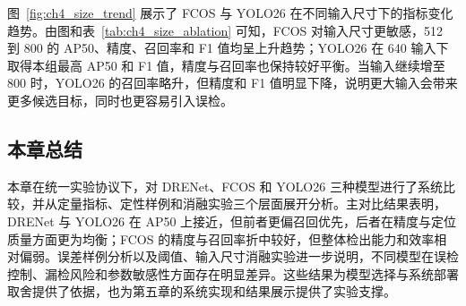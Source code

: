 图~\ref{fig:ch4_size_trend} 展示了 FCOS 与 YOLO26 在不同输入尺寸下的指标变化趋势。由图和表~\ref{tab:ch4_size_ablation} 可知，FCOS 对输入尺寸更敏感，512 到 800 的 AP50、精度、召回率和 F1 值均呈上升趋势；YOLO26 在 640 输入下取得本组最高 AP50 和 F1 值，精度与召回率也保持较好平衡。当输入继续增至 800 时，YOLO26 的召回率略升，但精度和 F1 值明显下降，说明更大输入会带来更多候选目标，同时也更容易引入误检。

\subsection{本章总结}

本章在统一实验协议下，对 DRENet、FCOS 和 YOLO26 三种模型进行了系统比较，并从定量指标、定性样例和消融实验三个层面展开分析。主对比结果表明，DRENet 与 YOLO26 在 AP50 上接近，但前者更偏召回优先，后者在精度与定位质量方面更为均衡；FCOS 的精度与召回率折中较好，但整体检出能力和效率相对偏弱。误差样例分析以及阈值、输入尺寸消融实验进一步说明，不同模型在误检控制、漏检风险和参数敏感性方面存在明显差异。这些结果为模型选择与系统部署取舍提供了依据，也为第五章的系统实现和结果展示提供了实验支撑。
